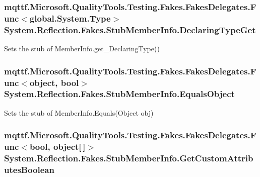 \hypertarget{class_system_1_1_reflection_1_1_fakes_1_1_stub_member_info_a39b2013c283886c2291780a2a7b8d1be}{
\subsubsection[{Declaring\-Type\-Get}]{\setlength{\rightskip}{0pt plus 5cm}mqttf.\-Microsoft.\-Quality\-Tools.\-Testing.\-Fakes.\-Fakes\-Delegates.\-Func$<$global.\-System.\-Type$>$ System.\-Reflection.\-Fakes.\-Stub\-Member\-Info.\-Declaring\-Type\-Get}}\label{class_system_1_1_reflection_1_1_fakes_1_1_stub_member_info_a39b2013c283886c2291780a2a7b8d1be}


Sets the stub of Member\-Info.\-get\-\_\-\-Declaring\-Type()

\hypertarget{class_system_1_1_reflection_1_1_fakes_1_1_stub_member_info_ab9c8da97f05d69bcab280b5f7ae09d17}{
\subsubsection[{Equals\-Object}]{\setlength{\rightskip}{0pt plus 5cm}mqttf.\-Microsoft.\-Quality\-Tools.\-Testing.\-Fakes.\-Fakes\-Delegates.\-Func$<$object, bool$>$ System.\-Reflection.\-Fakes.\-Stub\-Member\-Info.\-Equals\-Object}}\label{class_system_1_1_reflection_1_1_fakes_1_1_stub_member_info_ab9c8da97f05d69bcab280b5f7ae09d17}


Sets the stub of Member\-Info.\-Equals(\-Object obj)

\hypertarget{class_system_1_1_reflection_1_1_fakes_1_1_stub_member_info_abf950b01e7e40cd9bbabcab9cfc2f299}{
\subsubsection[{Get\-Custom\-Attributes\-Boolean}]{\setlength{\rightskip}{0pt plus 5cm}mqttf.\-Microsoft.\-Quality\-Tools.\-Testing.\-Fakes.\-Fakes\-Delegates.\-Func$<$bool, object\mbox{[}$\,$\mbox{]}$>$ System.\-Reflection.\-Fakes.\-Stub\-Member\-Info.\-Get\-Custom\-Attributes\-Boolean}}\label{class_system_1_1_reflection_1_1_fakes_1_1_stub_member_info_abf950b01e7e40cd9bbabcab9cfc2f299}


